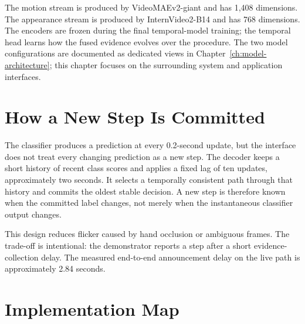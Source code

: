 The motion stream is produced by VideoMAEv2-giant and has 1,408 dimensions.
The appearance stream is produced by InternVideo2-B14 and has 768 dimensions.
The encoders are frozen during the final temporal-model training; the temporal
head learns how the fused evidence evolves over the procedure. The two model
configurations are documented as dedicated views in Chapter~\ref{ch:model-architecture};
this chapter focuses on the surrounding system and application interfaces.

\section{How a New Step Is Committed}

The classifier produces a prediction at every 0.2-second update, but the
interface does not treat every changing prediction as a new step. The decoder
keeps a short history of recent class scores and applies a fixed lag of ten
updates, approximately two seconds. It selects a temporally consistent path
through that history and commits the oldest stable decision. A new step is
therefore known when the committed label changes, not merely when the
instantaneous classifier output changes.

This design reduces flicker caused by hand occlusion or ambiguous frames. The
trade-off is intentional: the demonstrator reports a step after a short
evidence-collection delay. The measured end-to-end announcement delay on the
live path is approximately 2.84 seconds.

\section{Implementation Map}

